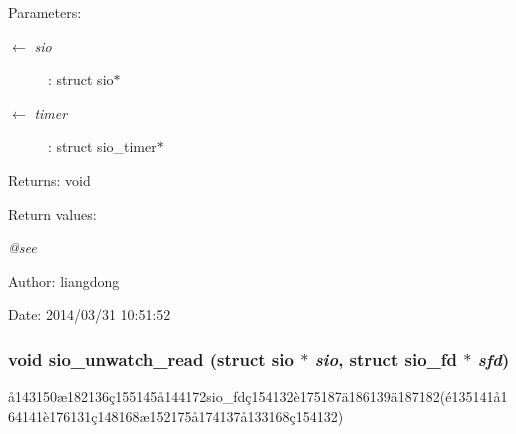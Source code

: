 \begin{Desc}
\item[Parameters:]
\begin{description}
\item[\mbox{$\leftarrow$} {\em sio}]: struct sio$\ast$ \item[\mbox{$\leftarrow$} {\em timer}]: struct sio\_\-timer$\ast$ \end{description}
\end{Desc}
\begin{Desc}
\item[Returns:]void \end{Desc}
\begin{Desc}
\item[Return values:]
\begin{description}
\item[{\em @see}]\end{description}
\end{Desc}
\begin{Desc}
\item[Author:]liangdong \end{Desc}
\begin{Desc}
\item[Date:]2014/03/31 10:51:52 \end{Desc}
\subsubsection{\setlength{\rightskip}{0pt plus 5cm}void sio\_\-unwatch\_\-read (struct sio $\ast$ {\em sio}, struct sio\_\-fd $\ast$ {\em sfd})}\label{sio_8h_a12}


\aa{}143150\ae{}182136\c{c}155145\aa{}144172sio\_\-fd\c{c}154132\`{e}175187\"{a}186139\"{a}187182(\'{e}135141\aa{}164141\`{e}176131\c{c}148168\ae{}152175\aa{}174137\aa{}133168\c{c}154132) 


